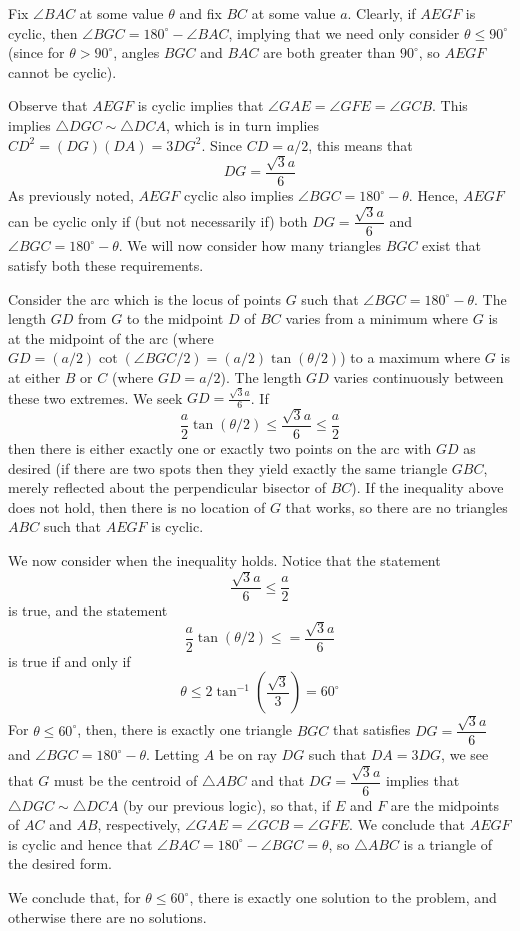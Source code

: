 \begin{mdsoln}
    Fix $\angle BAC$ at some value $\theta$ and fix $BC$ at some value $a$. Clearly, if $AEGF$ is cyclic, then $\angle BGC=180^\circ-\angle BAC$, implying that we need only consider $\theta\le 90^\circ$ (since for $\theta>90^\circ$, angles $BGC$ and $BAC$ are both greater than $90^\circ$, so $AEGF$ cannot be cyclic).

    Observe that $AEGF$ is cyclic implies that $\angle GAE=\angle GFE=\angle GCB$. This implies $\triangle DGC\sim \triangle DCA$, which is in turn implies $CD^2=(DG)(DA)=3DG^2$. Since $CD=a/2$, this means that$$DG=\frac{\sqrt{3}a}{6}$$As previously noted, $AEGF$ cyclic also implies $\angle BGC=180^\circ-\theta$. Hence, $AEGF$ can be cyclic only if (but not necessarily if) both $DG=\dfrac{\sqrt{3}a}{6}$ and $\angle BGC=180^\circ-\theta$. We will now consider how many triangles $BGC$ exist that satisfy both these requirements.
    
    Consider the arc which is the locus of points $G$ such that $\angle BGC=180^\circ-\theta$. The length $GD$ from $G$ to the midpoint $D$ of $BC$ varies from a minimum where $G$ is at the midpoint of the arc (where $GD=(a/2)\cot (\angle BGC/2)=(a/2)\tan(\theta/2)$) to a maximum where $G$ is at either $B$ or $C$ (where $GD=a/2$). The length $GD$ varies continuously between these two extremes. We seek $GD=\frac{\sqrt{3}a}{6}$. If$$\frac{a}{2}\tan(\theta/2)\le \frac{\sqrt{3}a}{6}\le \frac{a}{2}$$then there is either exactly one or exactly two points on the arc with $GD$ as desired (if there are two spots then they yield exactly the same triangle $GBC$, merely reflected about the perpendicular bisector of $BC$). If the inequality above does not hold, then there is no location of $G$ that works, so there are no triangles $ABC$ such that $AEGF$ is cyclic.
    
    We now consider when the inequality holds. Notice that the statement$$\frac{\sqrt{3}a}{6}\le \frac{a}{2}$$is true, and the statement$$\frac{a}{2}\tan(\theta/2)\le =\frac{\sqrt{3}a}{6}$$is true if and only if$$\theta\le 2\tan^{-1}(\frac{\sqrt{3}}{3})=60^\circ$$
    For $\theta\le 60^\circ$, then, there is exactly one triangle $BGC$ that satisfies $DG=\dfrac{\sqrt{3}a}{6}$ and $\angle BGC=180^\circ-\theta$. Letting $A$ be on ray $DG$ such that $DA=3DG$, we see that $G$ must be the centroid of $\triangle ABC$ and that $DG=\dfrac{\sqrt{3}a}{6}$ implies that $\triangle DGC\sim \triangle DCA$ (by our previous logic), so that, if $E$ and $F$ are the midpoints of $AC$ and $AB$, respectively, $\angle GAE=\angle GCB=\angle GFE$. We conclude that $AEGF$ is cyclic and hence that $\angle BAC=180^\circ-\angle BGC=\theta$, so $\triangle ABC$ is a triangle of the desired form.
    
    We conclude that, for $\theta\le 60^\circ$, there is exactly one solution to the problem, and otherwise there are no solutions.    
\end{mdsoln}






